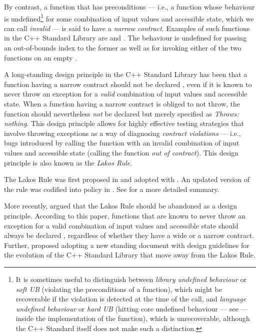 By contrast, a function that has preconditions --- i.e., a function whose behaviour is undefined\footnote{It is sometimes useful to distinguish between \emph{library undefined behaviour} or \emph{soft UB} (violating the preconditions of a function), which might be recoverable if the violation is detected at the time of the call, and \emph{language undefined behaviour} or \emph{hard UB} (hitting core undefined behaviour --- see \cite{P1705R1} --- inside the implementation of the function), which is unrecoverable, although the C++ Standard itself does not make such a distinction.} for some combination of input values and accessible state, which we can call \emph{invalid} --- is said to have a \emph{narrow contract}. Examples of such functions in the C++ Standard Library are  and . The behaviour is undefined for passing an out-of-bounds index to the former as well as for invoking either of the two functions on an empty .

A long-standing design principle in the C++ Standard Library has been that a function having a narrow contract should not be declared , even if it is known to never throw an exception for a \emph{valid} combination of input values and accessible state. When a function having a narrow contract is obliged to not throw, the function should nevertheless \emph{not} be declared  but merely specified as \emph{Throws: nothing}. This design principle allows for highly effective testing strategies that involve throwing exceptions as a way of diagnosing \emph{contract violations} --- i.e., bugs introduced by calling the function with an invalid combination of input values and accessible state (calling the function \emph{out of contract}). This design principle is also known as the \emph{Lakos Rule}.

The Lakos Rule was first proposed in \cite{N3248} and adopted with \cite{N3279}. An updated version of the rule was codified into policy in \cite{P0884R0}. See \cite{O'Dwyer2018} for a more detailed summary.

More recently, \cite{P1656R2} argued that the Lakos Rule should be abandoned as a design principle. According to this paper, functions that are known to never throw an exception for a valid combination of input values and accessible state should always be declared , regardless of whether they have a wide or a narrow contract. Further, \cite{P2148R0} proposed adopting a new standing document with design guidelines for the evolution of the C++ Standard Library that move away from the Lakos Rule.

